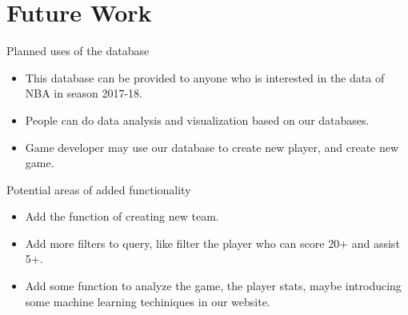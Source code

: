 \documentclass[a4paper,12pt]{article} %
\begin{document}
\section{Future Work}
Planned uses of the database
\begin{itemize}
    \item This database can be provided to anyone who is interested in the data of NBA in season 2017-18. 
    \item People can do data analysis and visualization based on our databases. 
    \item Game developer may use our database to create new player, and create new game.
\end{itemize}
Potential areas of added functionality                                  
\begin{itemize}
\item Add the function of creating new team. 
\item Add more filters to query, like filter the player who can score 20+ and assist 5+.
\item Add some function to analyze the game, the player stats, maybe introducing some machine learning techiniques in our website.
\end{itemize}
\end{document}
